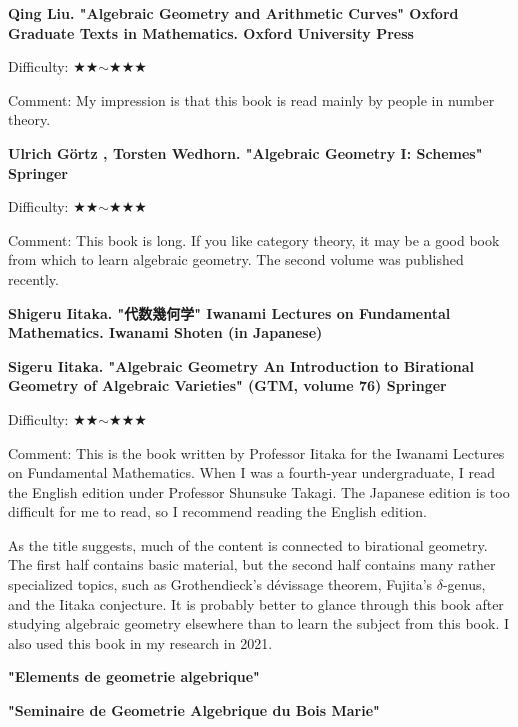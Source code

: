 \textbf{Qing Liu. "Algebraic Geometry and Arithmetic Curves" Oxford Graduate Texts in Mathematics. Oxford University Press}

Difficulty: ★★$\sim$★★★  \vspace{-6pt}

Comment: My impression is that this book is read mainly by people in number theory.
\vspace{8pt}

\textbf{Ulrich G\"ortz , Torsten Wedhorn. "Algebraic Geometry I: Schemes" Springer}

Difficulty: ★★$\sim$★★★  \vspace{-6pt}

Comment: This book is long. If you like category theory, it may be a good book from which to learn algebraic geometry. The second volume was published recently.
\vspace{8pt}

\textbf{Shigeru Iitaka. "代数幾何学" Iwanami Lectures on Fundamental Mathematics. Iwanami Shoten  (in Japanese)} \vspace{-6pt}

\textbf{Sigeru Iitaka. "Algebraic Geometry
An Introduction to Birational Geometry of Algebraic Varieties"  (GTM, volume 76) Springer} \vspace{-6pt}

Difficulty: ★★$\sim$★★★  \vspace{-6pt} 

Comment: This is the book written by Professor Iitaka for the Iwanami Lectures on Fundamental Mathematics. When I was a fourth-year undergraduate, I read the English edition under Professor Shunsuke Takagi. The Japanese edition is too difficult for me to read, so I recommend reading the English edition.

As the title suggests, much of the content is connected to birational geometry. The first half contains basic material, but the second half contains many rather specialized topics, such as Grothendieck's d\'evissage theorem, Fujita's $\delta$-genus, and the Iitaka conjecture. It is probably better to glance through this book after studying algebraic geometry elsewhere than to learn the subject from this book. I also used this book in my research in 2021.
\vspace{8pt}

\textbf{"Elements de geometrie algebrique"} \vspace{-6pt}

\textbf{"Seminaire de Geometrie Algebrique du Bois Marie"} \vspace{-6pt}

